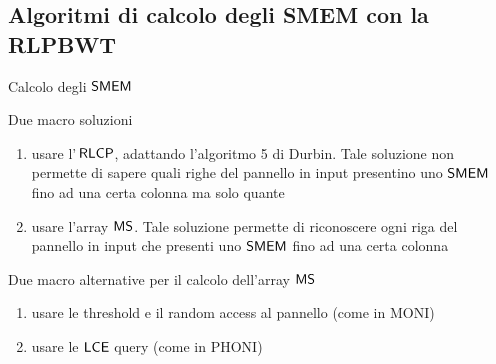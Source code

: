 \documentclass[]{beamer}
\def\LCE{\mbox{\rm {\sf LCE}}}
\def\RLCP{\mbox{\rm {\sf RLCP}}}
\def\MS{\mbox{\rm {\sf MS}}}
\def\SMEM{\mbox{\rm {\sf SMEM}}}
\def\LCE{\mbox{\rm {\sf LCE}}}
\begin{document}
\subsection{Algoritmi di calcolo degli SMEM con la RLPBWT}
\begin{frame}{Calcolo degli $\SMEM$}
  \begin{block}{Due macro soluzioni}
    \begin{enumerate}
      \item usare l'$\,\RLCP$, adattando l'algoritmo 5 di Durbin. Tale soluzione
      non permette di sapere quali righe del pannello in input presentino uno
      $\SMEM$ fino ad una certa colonna ma solo quante
      \item usare l'array $\MS$. Tale soluzione
      permette di riconoscere ogni riga del pannello in input che presenti uno
      $\SMEM$ fino ad una certa colonna
    \end{enumerate}    
  \end{block}
  \pause
  \begin{block}{Due macro alternative per il calcolo dell'array $\MS$}
    \begin{enumerate}
      \item usare le threshold e il random access al pannello (come in MONI)
      \item usare le $\LCE$ query (come in PHONI)
    \end{enumerate}
  \end{block}
\end{frame}
\end{document}
